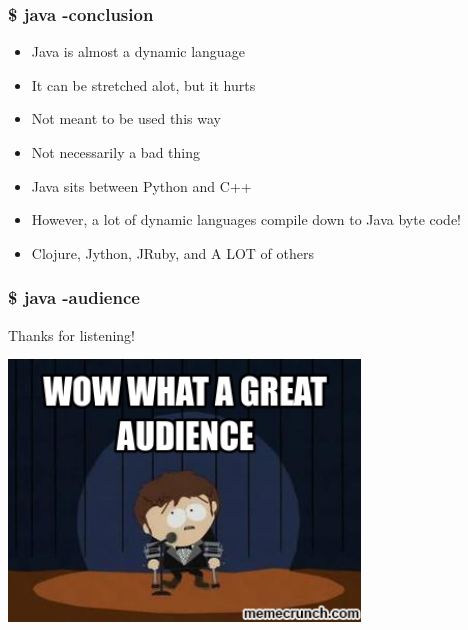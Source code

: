 \begin{frame}
  \frametitle{\$ java -conclusion}

  \vspace{0.25cm}
  \begin{itemize}
    \item Java is almost a dynamic language
    \vspace{0.4cm} 
    \item It can be stretched alot, but it hurts
    \vspace{0.4cm}      
    \item Not meant to be used this way
    \vspace{0.4cm}    
    \item Not necessarily a bad thing
    \vspace{0.4cm}
    \item Java sits between Python and C++
    \vspace{0.4cm}
    \item However, a lot of dynamic languages compile down to Java byte code!
    \vspace{0.4cm}
    \item Clojure, Jython, JRuby, and A LOT of others
  \end{itemize}
\end{frame}



\begin{frame}
  \frametitle{\$ java -audience}
  \center
  Thanks for listening!
  \vspace{0.4cm}
  \begin{center}
  \includegraphics[width=0.7\textwidth]{fig/audience}
  \end{center}
\end{frame}